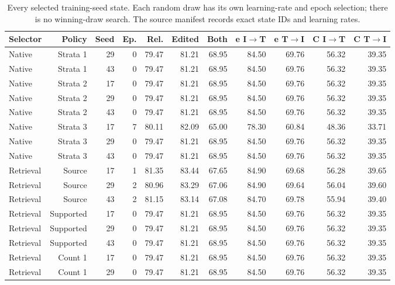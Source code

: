\begin{table}[t]
\nolinenumbers
\centering
\small
\setlength{\tabcolsep}{3pt}
\begin{tabular}{lrrrrrrrrrr}
\toprule
Selector & Policy & Seed & Ep. & Rel. & Edited & Both & e I$\to$T & e T$\to$I & C I$\to$T & C T$\to$I\\
\midrule
Native & Strata 1 & 29 & 0 & 79.47 & 81.21 & 68.95 & 84.50 & 69.76 & 56.32 & 39.35\\
Native & Strata 1 & 43 & 0 & 79.47 & 81.21 & 68.95 & 84.50 & 69.76 & 56.32 & 39.35\\
Native & Strata 2 & 17 & 0 & 79.47 & 81.21 & 68.95 & 84.50 & 69.76 & 56.32 & 39.35\\
Native & Strata 2 & 29 & 0 & 79.47 & 81.21 & 68.95 & 84.50 & 69.76 & 56.32 & 39.35\\
Native & Strata 2 & 43 & 0 & 79.47 & 81.21 & 68.95 & 84.50 & 69.76 & 56.32 & 39.35\\
Native & Strata 3 & 17 & 7 & 80.11 & 82.09 & 65.00 & 78.30 & 60.84 & 48.36 & 33.71\\
Native & Strata 3 & 29 & 0 & 79.47 & 81.21 & 68.95 & 84.50 & 69.76 & 56.32 & 39.35\\
Native & Strata 3 & 43 & 0 & 79.47 & 81.21 & 68.95 & 84.50 & 69.76 & 56.32 & 39.35\\
Retrieval & Source & 17 & 1 & 81.35 & 83.44 & 67.65 & 84.90 & 69.68 & 56.28 & 39.65\\
Retrieval & Source & 29 & 2 & 80.96 & 83.29 & 67.06 & 84.90 & 69.64 & 56.04 & 39.60\\
Retrieval & Source & 43 & 2 & 81.15 & 83.14 & 67.08 & 84.70 & 69.78 & 55.94 & 39.40\\
Retrieval & Supported & 17 & 0 & 79.47 & 81.21 & 68.95 & 84.50 & 69.76 & 56.32 & 39.35\\
Retrieval & Supported & 29 & 0 & 79.47 & 81.21 & 68.95 & 84.50 & 69.76 & 56.32 & 39.35\\
Retrieval & Supported & 43 & 0 & 79.47 & 81.21 & 68.95 & 84.50 & 69.76 & 56.32 & 39.35\\
Retrieval & Count 1 & 17 & 0 & 79.47 & 81.21 & 68.95 & 84.50 & 69.76 & 56.32 & 39.35\\
Retrieval & Count 1 & 29 & 0 & 79.47 & 81.21 & 68.95 & 84.50 & 69.76 & 56.32 & 39.35\\
\bottomrule
\end{tabular}
\caption{Every selected training-seed state. Each random draw has its own learning-rate and epoch selection; there is no winning-draw search. The source manifest records exact state IDs and learning rates.}\label{tab:fusel1}
\end{table}
